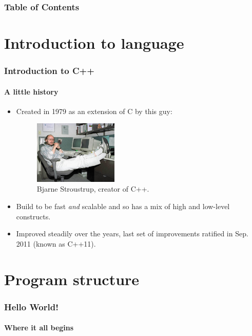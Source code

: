 \documentclass{beamer}
\subtitle{Session 0: Basics}
\begin{document}
\frame{\titlepage}

\begin{frame}
\frametitle{Table of Contents}
\tableofcontents
\end{frame}

\section{Introduction to language}

\begin{frame}
	\frametitle{Introduction to C++}
	\framesubtitle{A little history}
	\begin{itemize}
	  \item<1->{Created in 1979 as an extension of C by this guy:\pause
		\begin{figure}
			\includegraphics[height=30mm]{./figs/BjarneStroustrup.eps}
			\caption{Bjarne Stroustrup, creator of C++.}
		\end{figure}}
	  \item<3->{Build to be fast \textit{and} scalable and so has a mix of high and low-level constructs.}
	  \item<4->{Improved steadily over the years, last set of improvements ratified in Sep. 2011 (known as C++11).}
	\end{itemize}
	
\end{frame}


\section{Program structure}



\begin{frame}[fragile]
  \frametitle{Hello World!}
  \framesubtitle{Where it all begins}

  \begin{columns}[t]
    \begin{column}[T]{0.55\textwidth}	
    \end{column}
    \begin{column}[T]{0.45\textwidth}
		\end{column}
	\end{columns}
\end{frame}
\end{document}
